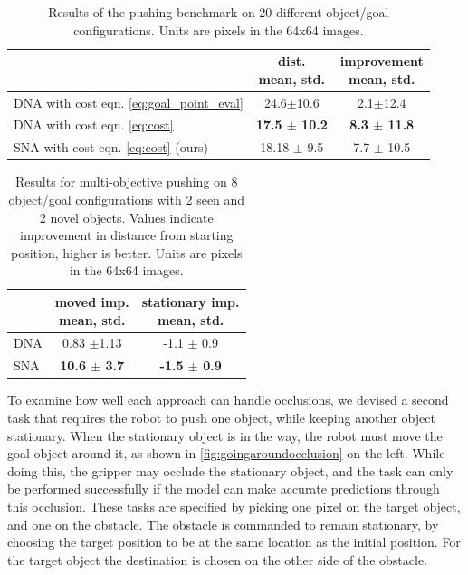 \begin{table}
{\footnotesize
    \begin{center}
    \begin{tabular}{lcc}
    	\toprule
           &  \thead{dist. \\ mean, std.} & \thead{improvement \\ mean, std.}  \\  
           \midrule
      DNA with cost eqn. \ref{eq:goal_point_eval}\cite{foresight}  & 24.6$\pm$10.6 & 2.1$\pm$12.4 \\
      DNA with cost eqn. \ref{eq:cost}  & \textbf{17.5 $\pm$ 10.2} &  \textbf{8.3 $\pm$ 11.8}\\ 
      SNA with cost eqn. \ref{eq:cost} (ours) & 18.18 $\pm$ 9.5 & 7.7 $\pm$ 10.5\\
      \bottomrule
    \end{tabular}
    \end{center}
    }
    \caption{Results of the pushing benchmark on 20 different object/goal configurations. Units are pixels in the 64x64 images.}
    \label{table:res_dna_sna}
\end{table}


\begin{table}
\centering
{\footnotesize
\begin{tabular}{lcc}
	\toprule
         &  \thead{moved imp. \\ mean, std.} &   \thead{stationary imp. \\ mean, std.}  \\
         \midrule
  DNA \cite{foresight} & 0.83 $\pm$1.13 &  -1.1 $\pm$ 0.9\\ 
  SNA & \textbf{10.6 $\pm$ 3.7} & \textbf{-1.5 $\pm$ 0.9} \\
  \bottomrule
\end{tabular}
}

\caption{Results for multi-objective pushing on 8 object/goal configurations with 2 seen and 2 novel objects. Values indicate improvement in distance from starting position, higher is better. Units are pixels in the 64x64 images.} 
\label{table:mult_obj}

\end{table}

To examine how well each approach can handle occlusions, we devised a second task that requires the robot to push one object, while keeping another object stationary. When the stationary object is in the way, the robot must move the goal object around it, as shown in \autoref{fig:goingaroundocclusion} on the left. While doing this, the gripper may occlude the stationary object, and the task can only be performed successfully if the model can make accurate predictions through this occlusion. These tasks are specified by picking one pixel on the target object, and one on the obstacle. The obstacle is commanded to remain stationary, by choosing the target position to be at the same location as the initial position. For the target object the destination is chosen on the other side of the obstacle.

